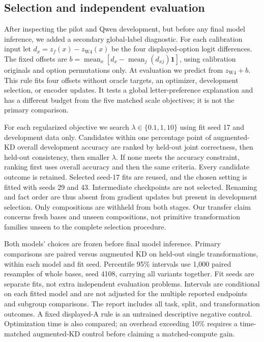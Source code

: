 \documentclass[11pt]{article}
\begin{document}
\subsection{Selection and independent evaluation}
After inspecting the pilot and Qwen development, but before any final model
inference, we added a secondary global-label diagnostic. For each calibration
input let $d_x=z_f(x)-z_{\mathrm{W4}}(x)$ be the four displayed-option logit
differences. The fixed offsets are
$b=\operatorname{mean}_x[d_x-\operatorname{mean}_j(d_{xj})\mathbf{1}]$,
using calibration originals and option permutations only. At evaluation we
predict from $z_{\mathrm{W4}}+b$. This rule fits four offsets without oracle
targets, an optimizer, development selection, or encoder updates. It tests
a global letter-preference explanation and has a different budget from the
five matched scale objectives; it is not the primary comparison.

For each regularized objective we search $\lambda\in\{0.1,1,10\}$ using
fit seed 17 and development data only. Candidates within one percentage point
of augmented-KD overall development accuracy are ranked by held-out joint
correctness, then held-out consistency, then smaller $\lambda$.
If none meets the accuracy constraint, ranking first uses overall accuracy
and then the same criteria. Every candidate outcome is retained.
Selected seed-17 fits are reused, and the chosen setting is fitted with
seeds 29 and 43. Intermediate checkpoints are not selected.
Renaming and fact order are thus absent from gradient updates but present in
development selection. Only compositions are withheld from both stages.
Our transfer claim concerns fresh bases and unseen compositions, not primitive
transformation families unseen to the complete selection procedure.

Both models' choices are frozen before final model inference. Primary
comparisons are paired versus augmented KD on held-out single transformations,
within each model and fit seed. Percentile 95\% intervals use 1,000 paired
resamples of whole bases, seed 4108, carrying all variants together.
Fit seeds are separate fits, not extra independent evaluation problems.
Intervals are conditional on each fitted model and are not adjusted for
the multiple reported endpoints and subgroup comparisons.
The report includes all task, split, and transformation outcomes.
A fixed displayed-A rule is an untrained descriptive negative control.
Optimization time is also compared; an overhead exceeding 10\% requires
a time-matched augmented-KD control before claiming a matched-compute gain.
\end{document}
